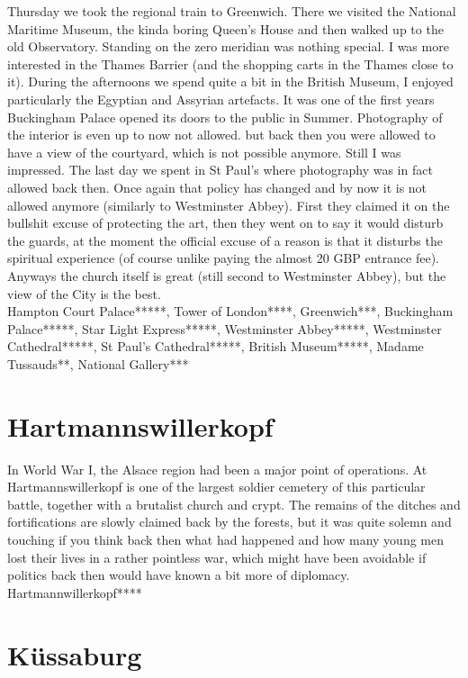 Thursday we took the regional train to Greenwich. There we visited the National Maritime Museum, the kinda boring Queen's House and then walked up to the old Observatory. Standing on the zero meridian was nothing special. I was more interested in the Thames Barrier (and the shopping carts in the Thames close to it). During the afternoons we spend quite a bit in the British Museum, I enjoyed particularly the Egyptian and Assyrian artefacts. It was one of the first years Buckingham Palace opened its doors to the public in Summer. Photography of the interior is even up to now not allowed. but back then you were allowed to have a view of the courtyard, which is not possible anymore. Still I was impressed. The last day we spent in St Paul's where photography was in fact allowed back then. Once again that policy has changed and by now it is not allowed anymore (similarly to Westminster Abbey). First they claimed it on the bullshit excuse of protecting the art, then they went on to say it would disturb the guards, at the moment the official excuse of a reason is that it disturbs the spiritual experience (of course unlike paying the almost 20 GBP entrance fee). Anyways the church itself is great (still second to Westminster Abbey), but the view of the City is the best.\\

Hampton Court Palace*****, Tower of London****, Greenwich***, Buckingham Palace*****, Star Light Express*****, Westminster Abbey*****, Westminster Cathedral*****, St Paul's Cathedral*****, British Museum*****, Madame Tussauds**, National Gallery***

\section{Hartmannswillerkopf}
\label{1996:Hartmannswillerkopf}

In World War I, the Alsace region had been a major point of operations. At Hartmannswillerkopf is one of the largest soldier cemetery of this particular battle, together with a brutalist church and crypt. The remains of the ditches and fortifications are slowly claimed back by the forests, but it was quite solemn and touching if you think back then what had happened and how many young men lost their lives in a rather pointless war, which might have been avoidable if politics back then would have known a bit more of diplomacy.\\

Hartmannwillerkopf****

\section{K\"ussaburg}
\label{1996:Kuessaburg}

